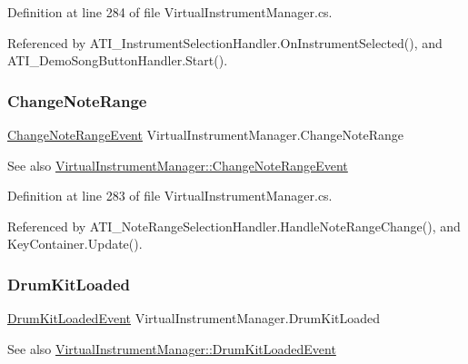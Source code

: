 Definition at line 284 of file Virtual\+Instrument\+Manager.\+cs.



Referenced by A\+T\+I\+\_\+\+Instrument\+Selection\+Handler.\+On\+Instrument\+Selected(), and A\+T\+I\+\_\+\+Demo\+Song\+Button\+Handler.\+Start().

\mbox{\label{group___v_i_m_events_gab6fa99d08e8466406835b9fc4ff859f1}} 
\subsubsection{\texorpdfstring{Change\+Note\+Range}{ChangeNoteRange}}
{\footnotesize\ttfamily \hyperlink{group___v_i_m_event_types_class_virtual_instrument_manager_1_1_change_note_range_event}{Change\+Note\+Range\+Event} Virtual\+Instrument\+Manager.\+Change\+Note\+Range}

\begin{DoxySeeAlso}{See also}
\hyperlink{group___v_i_m_event_types_class_virtual_instrument_manager_1_1_change_note_range_event}{Virtual\+Instrument\+Manager\+::\+Change\+Note\+Range\+Event} 
\end{DoxySeeAlso}


Definition at line 283 of file Virtual\+Instrument\+Manager.\+cs.



Referenced by A\+T\+I\+\_\+\+Note\+Range\+Selection\+Handler.\+Handle\+Note\+Range\+Change(), and Key\+Container.\+Update().

\mbox{\label{group___v_i_m_events_ga2dea060b2fba524166433300113dc281}} 
\subsubsection{\texorpdfstring{Drum\+Kit\+Loaded}{DrumKitLoaded}}
{\footnotesize\ttfamily \hyperlink{group___v_i_m_event_types_class_virtual_instrument_manager_1_1_drum_kit_loaded_event}{Drum\+Kit\+Loaded\+Event} Virtual\+Instrument\+Manager.\+Drum\+Kit\+Loaded}

\begin{DoxySeeAlso}{See also}
\hyperlink{group___v_i_m_event_types_class_virtual_instrument_manager_1_1_drum_kit_loaded_event}{Virtual\+Instrument\+Manager\+::\+Drum\+Kit\+Loaded\+Event} 
\end{DoxySeeAlso}


